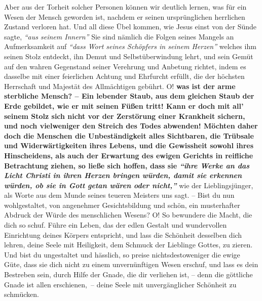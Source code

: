 Aber aus der Torheit solcher Personen können wir deutlich lernen, was für ein
Wesen der Mensch geworden ist, nachdem er seinen ursprünglichen herrlichen
Zustand verloren hat. Und all diese Übel kommen, wie Jesus einst von der
Sünde
sagte,
\textit{"`aus seinem Innern"'}
Sie sind nämlich
die Folgen seines Mangels an Aufmerksamkeit auf
\textit{"`dass Wort seines Schöpfers in
seinem Herzen"'}
welches ihm seinen Stolz
entdeckt, ihn Demut und
Selbstüberwindung
lehrt, und sein Gemüt auf den
wahren Gegenstand seiner Verehrung und Anbetung richtet, indem es dasselbe mit
einer feierlichen Achtung und Ehrfurcht erfüllt, die der höchsten Herrschaft und
Majestät des Allmächtigen gebührt. O!
 \label{ref:11_10_juengstes_gericht}
\textbf{was ist der arme sterbliche Mensch? --
Ein lebender Staub, aus dem gleichen Staub der Erde gebildet, wie er mit seinen
Füßen tritt! Kann er doch mit all' seinem Stolz sich nicht vor der Zerstörung
einer Krankheit sichern, und noch vielweniger den Streich des Todes abwenden!
Möchten daher doch die Menschen die Unbeständigkeit alles Sichtbaren, die
Trübsale und Widerwärtigkeiten ihres Lebens, und die Gewissheit sowohl ihres
Hinscheidens, als auch der Erwartung des ewigen Gerichts in reifliche
Betrachtung ziehen, so ließe sich hoffen, dass sie
\textit{"`ihre Werke an das Licht
Christi in ihren Herzen bringen würden, damit sie erkennen würden, ob sie in
Gott
getan wären oder nicht,"'} }
wie der Lieblingsjünger, als
Worte aus dem Munde seines teueren Meisters uns sagt. -- Bist du nun
wohlgestaltet, von angenehmer Gesichtsbildung und schön, ein musterhafter
Abdruck der Würde des menschlichen Wesens? O! So bewundere die Macht, die dich
so schuf. Führe ein Leben, das der edlen Gestalt und wundervollen Einrichtung
deines Körpers entspricht, und lass die Schönheit desselben dich lehren, deine
Seele mit Heiligkeit, dem Schmuck der
Lieblinge Gottes, zu zieren. Und bist du
ungestaltet und hässlich, so preise nichtsdestoweniger die ewige Güte, dass sie
dich nicht zu einem unvernünftigen Wesen erschuf, und lass es dein Bestreben
sein, durch Hilfe der Gnade, die dir verliehen ist, -- denn die
göttliche Gnade
ist allen erschienen,~-- deine Seele mit unvergänglicher Schönheit zu schmücken.
